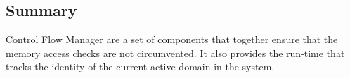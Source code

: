 %
%
%
%
%
%
%
\subsection{Summary}
%
Control Flow Manager are a set of components that together ensure that
the memory access checks are not circumvented.
%
It also provides the run-time that tracks the identity of the current
active domain in the system.